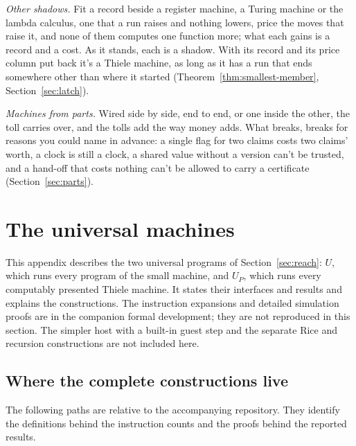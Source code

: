 \documentclass[11pt,twoside]{article}
\theoremstyle{thielethm}
\theoremstyle{thieledef}
\theoremstyle{thieledef}
\theoremstyle{thieledef}
\theoremstyle{thielethm}
\theoremstyle{thieleobs}
\theoremstyle{thielethm}
\begin{document}
\emph{Other shadows.} Fit a record beside a register machine, a Turing machine or the lambda
calculus, one that a run raises and nothing lowers, price the moves that raise it, and none of them
computes one function more; what each gains is a record and a cost. As it stands, each is a shadow.
With its record and its price column put back it's a Thiele machine, as long as it has a run that
ends somewhere other than where it started (Theorem~\ref{thm:smallest-member},
Section~\ref{sec:latch}).

\emph{Machines from parts.} Wired side by side, end to end, or one inside the other, the toll carries
over, and the tolls add the way money adds. What breaks, breaks for reasons you
could name in advance: a single flag for two claims costs two claims' worth, a clock is still a clock,
a shared value without a version can't be trusted, and a hand-off that costs nothing can't be allowed
to carry a certificate (Section~\ref{sec:parts}).


\section{The universal machines}
\label{sec:universal-machines}

This appendix describes the two universal programs of Section~\ref{sec:reach}: $U$, which
runs every program of the small machine, and $U_P$, which runs every computably presented
Thiele machine. It states their interfaces and results and explains the constructions.
The instruction expansions and detailed simulation proofs are in the companion formal
development; they are not reproduced in this section. The simpler host with a built-in
guest step and the separate Rice and recursion constructions are not included here.

\subsection*{Where the complete constructions live}
\label{sec:universal-proof-sources}

The following paths are relative to the accompanying repository. They identify the
definitions behind the instruction counts and the proofs behind the reported results.
\end{document}

